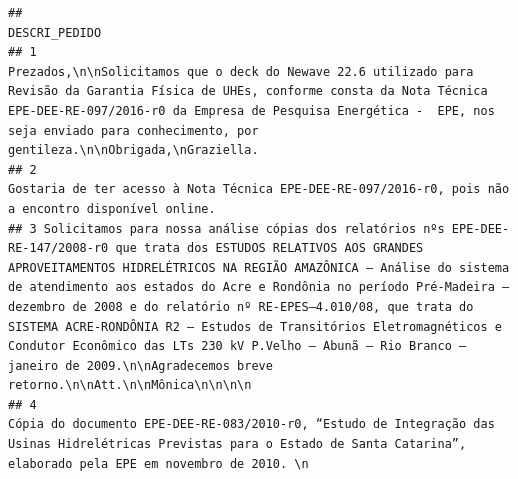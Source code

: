 \documentclass[]{article}
\begin{document}
\begin{verbatim}
##                                                                                                                                                                                                                                                                                                                                                                                                                                                                                                                                                 DESCRI_PEDIDO
## 1                                                                                                                                                                                                                                                                          Prezados,\n\nSolicitamos que o deck do Newave 22.6 utilizado para Revisão da Garantia Física de UHEs, conforme consta da Nota Técnica EPE-DEE-RE-097/2016-r0 da Empresa de Pesquisa Energética -  EPE, nos seja enviado para conhecimento, por gentileza.\n\nObrigada,\nGraziella.
## 2                                                                                                                                                                                                                                                                                                                                                                                                                                                        Gostaria de ter acesso à Nota Técnica EPE-DEE-RE-097/2016-r0, pois não a encontro disponível online.
## 3 Solicitamos para nossa análise cópias dos relatórios nºs EPE-DEE-RE-147/2008-r0 que trata dos ESTUDOS RELATIVOS AOS GRANDES APROVEITAMENTOS HIDRELÉTRICOS NA REGIÃO AMAZÔNICA – Análise do sistema de atendimento aos estados do Acre e Rondônia no período Pré-Madeira – dezembro de 2008 e do relatório nº RE-EPES–4.010/08, que trata do SISTEMA ACRE-RONDÔNIA R2 – Estudos de Transitórios Eletromagnéticos e Condutor Econômico das LTs 230 kV P.Velho – Abunã – Rio Branco – janeiro de 2009.\n\nAgradecemos breve retorno.\n\nAtt.\n\nMônica\n\n\n\n
## 4                                                                                                                                                                                                                                                                                                                                                                            Cópia do documento EPE-DEE-RE-083/2010-r0, “Estudo de Integração das Usinas Hidrelétricas Previstas para o Estado de Santa Catarina”, elaborado pela EPE em novembro de 2010. \n

\end{verbatim}
\end{document}
